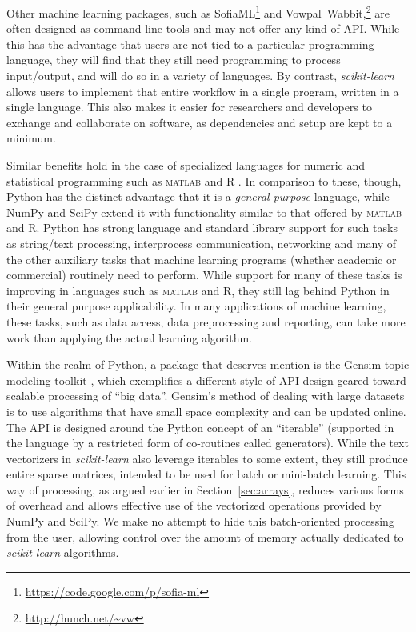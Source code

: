 \documentclass[twocolumn]{article}
\newcommand{\sklearn}{\textit{scikit-learn}\xspace}
\begin{document}
Other machine learning packages,
such as SofiaML\footnote{\url{https://code.google.com/p/sofia-ml}}
and Vowpal~Wabbit,\footnote{\url{http://hunch.net/~vw}}
are often designed as command-line tools
and may not offer any kind of API\@.
While this has the advantage that users are not tied
to a particular programming language,
they will find that they still need programming to process input/output,
and will do so in a variety of languages.
By contrast, \sklearn allows users to implement that entire workflow
in a single program, written in a single language.
This also makes it easier for researchers and developers
to exchange and collaborate on software, as dependencies and setup are kept to a
minimum.

Similar benefits hold in the case of specialized languages
for numeric and statistical programming
such as \textsc{matlab} and R \citep{r}.
In comparison to these, though, Python has the distinct advantage
that it is a \textit{general purpose} language,
while NumPy and SciPy extend it with functionality
similar to that offered by \textsc{matlab} and R.
Python has strong language and standard library support for such tasks as
string/text processing, interprocess communication, networking
and many of the other auxiliary tasks that machine learning programs
(whether academic or commercial) routinely need to perform.
While support for many of these tasks is improving in languages such as
\textsc{matlab} and R, they still lag behind Python in their general purpose
applicability.
In many applications of machine learning, these tasks, such as data access,
data preprocessing and reporting, can take more work than applying
the actual learning algorithm.

Within the realm of Python,
a package that deserves mention is the Gensim topic modeling toolkit
\citep{rehurek2010gensim},
which exemplifies a different style of API design
geared toward scalable processing of ``big data''.
Gensim's method of dealing with large datasets is to use algorithms
that have small space complexity and can be updated online.
The API is designed around the Python concept of an ``iterable''
(supported in the language by a restricted form of co-routines called generators).
While the text vectorizers in \sklearn
also leverage iterables to some extent,
they still produce entire sparse matrices,
intended to be used for batch or mini-batch learning.
This way of processing, as argued earlier in Section~\ref{sec:arrays},
reduces various forms of overhead
and allows effective use of the vectorized operations provided by NumPy and
SciPy.  We make no attempt to hide this batch-oriented processing from the user,
allowing control over the amount of memory actually dedicated
to \sklearn algorithms.
\end{document}
